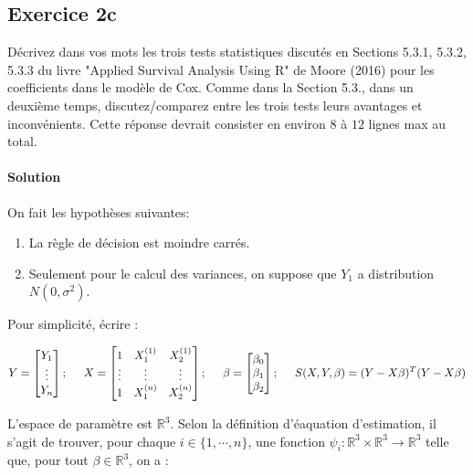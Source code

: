 \documentclass[../main.tex]{subfiles}
\begin{document}
\begin{CJK*}{UTF8}{gbsn}
\section*{Exercice 2c}

Décrivez dans vos mots les trois tests statistiques discutés en Sections 5.3.1, 5.3.2,
5.3.3 du livre "Applied Survival Analysis Using R" de Moore (2016) pour les coefficients dans le modèle de Cox. 
Comme dans la Section 5.3., dans un deuxième temps, discutez/comparez entre les trois tests leurs avantages et
inconvénients. Cette réponse devrait consister en environ $8$ à $12$ lignes max au total.

\smallskip
\paragraph{Solution}
On fait les hypothèses suivantes:

\begin{enumerate}
    \item La règle de décision est moindre carrés.
    \item Seulement pour le calcul des variances, on suppose que $Y_1$ a distribution $N(0, \sigma^2)$.
\end{enumerate}

Pour simplicité, écrire :

\begin{equation*}
    Y = 
    \begin{bmatrix}
        Y_1 \\
        \vdots \\
        Y_n
    \end{bmatrix}; \tab[0.5cm]
    X =
    \begin{bmatrix}
        1 & X^{(1)}_1 & X^{(1)}_2 \\
        \vdots & \vdots & \vdots \\
        1 & X^{(n)}_1 & X^{(n)}_2
    \end{bmatrix}; \tab[0.5cm]
    \beta =
    \begin{bmatrix}
        \beta_0 \\
        \beta_1 \\
        \beta_2
    \end{bmatrix}; \tab[0.5cm]
    S(X,Y,\beta) = (Y-X\beta)^T(Y-X\beta)
\end{equation*}

L'espace de paramètre est $\mathbb{R}^3$.
Selon la définition d'éaquation d'estimation, il s'agit de trouver, pour chaque $i \in \{1, \cdots, n\}$,
une fonction $\psi_i : \mathbb{R}^3 \times \mathbb{R}^3 \to \mathbb{R}^3$ telle que, pour 
tout $\beta \in \mathbb{R}^3$, on a :


\end{CJK*}
\end{document}
